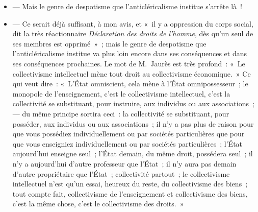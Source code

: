 \documentclass[french,twoside]{book} %
\begin{document}
\begin{itemize}[itemsep=0pt,]
\item  — Mais le genre de despotisme que l’anticléricalisme institue s’arrête là !
\item  — Ce serait déjà suffisant, à mon avis, et « il y a oppression du corps social, dit la très réactionnaire  \emph{Déclaration des droits de l’homme}, dès qu’un seul de ses membres est opprimé » ; mais le genre de despotisme que l’anticléricalisme institue va plus loin encore dans ses conséquences et dans ses conséquences prochaines. Le mot de M. Jaurès est très profond : « Le collectivisme intellectuel mène tout droit au collectivisme économique. » Ce qui veut dire : « L’État omniscient, cela mène à l’État omnipossesseur ; le monopole de l’enseignement, c’est le collectivisme intellectuel, c’est la collectivité se substituant, pour instruire, aux individus ou aux associations ; — du même principe sortira ceci : la collectivité se substituant, pour posséder, aux individus ou aux associations ; il n’y a pas plus de raison pour que vous possédiez individuellement ou par sociétés particulières que pour que vous enseigniez individuellement ou par sociétés particulières ; l’État aujourd’hui enseigne seul ; l’État demain, du même droit, possédera seul ; il n’y a aujourd’hui d’autre professeur que l’État ; il n’y aura pas demain d’autre propriétaire que l’État ; collectivité partout ; le collectivisme intellectuel n’est qu’un essai, heureux du reste, du collectivisme des biens ; tout compte fait, collectivisme de l’enseignement et collectivisme des biens, c’est la même chose, c’est le collectivisme des droits. »
\end{itemize}
\end{document}
